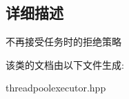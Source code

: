 \subsection{详细描述}
不再接受任务时的拒绝策略 

该类的文档由以下文件生成\+:\begin{DoxyCompactItemize}
\item 
threadpoolexecutor.\+hpp\end{DoxyCompactItemize}
